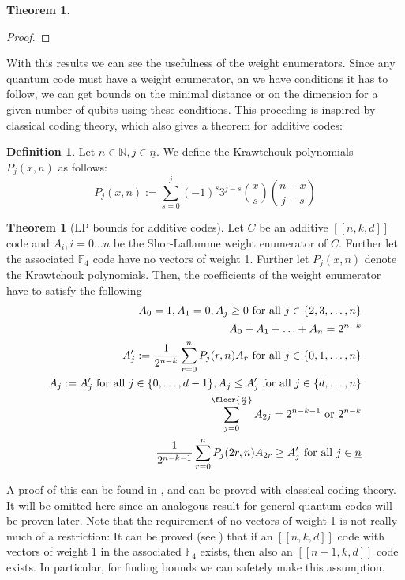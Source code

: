 \documentclass{article}
\def\N{\mathbb{N}}
\def\F{\mathbb{F}}
\def\n{\underline{n}}
\def\fa{\text{ for all }}
\theoremstyle{definition}
\newtheorem{theorem}[Satz]{Theorem}
\newtheorem{defn}[Satz]{Definition}
\begin{document}
\begin{theorem}
\begin{proof}
\end{proof}

\end{theorem}

With this results we can see the usefulness of the weight enumerators. Since any quantum code must have a weight enumerator, an we have conditions it has to follow, we can get bounds on the minimal distance or on the dimension for a given number of qubits using these conditions.
This proceding is inspired by classical coding theory, which also gives a theorem for additive codes:

\begin{defn}
Let $n \in \N, j \in \n$. We define the Krawtchouk polynomials $P_j(x,n)$ as follows: 
\begin{equation}
P_j(x,n) := \sum_{s=0}^j (-1)^s 3^{j-s} \binom{x}{s}\binom{n-x}{j-s}
\end{equation}
\end{defn}

\begin{theorem}[LP bounds for additive codes]\label{lpadditive}
Let $C$ be an additive $[[n,k,d]]$ code and $A_i, i = 0 \ldots n$ be the Shor-Laflamme weight enumerator of $C$. Further let the associated $\F_4$ code have no vectors of weight 1.
Further let $P_j(x,n)$ denote the Krawtchouk polynomials.  Then, the coefficients of the weight enumerator have to satisfy the following
\begin{align} 
A_0 = 1, A_1 = 0, A_j \geq 0 \text{ for all } j \in \{ 2,3, \ldots, n \} \\
A_0 + A_1 + \ldots + A_n = 2^{n-k} \\
A'_j := \frac{1}{2^{n-k}} \sum_{r = 0}^n P_j(r,n) A_r  \text{ for all } j \in \{ 0,1, \ldots, n \} \\
A_j := A'_j \text{ for all } j \in \{0, \ldots, d-1 \}, A_j \leq A'_j \fa j \in \{d, \ldots, n \} \\
\sum_{j=0}^{\floor{\frac{n}{2}}} A_{2j} = 2^{n-k-1} \text{ or } 2^{n-k} \\
\frac{1}{2^{n-k-1}} \sum_{r=0}^n P_j(2r,n)A_{2r} \geq A'_j \fa j \in \n
\end{align}

A proof of this can be found in \cite{gf4}, and can be proved with classical coding theory. It will be omitted here since an analogous result for general quantum codes will be proven later.
Note that the requirement of no vectors of weight 1 is not really much of a restriction: It can be proved (see \cite{gf4}) that if an $[[n,k,d]]$ code with vectors of weight 1 in the associated $\F_4$ exists,
then also an $[[n-1,k,d]]$ code exists. In particular, for finding bounds we can safetely make this assumption.
\end{theorem}
\end{document}
